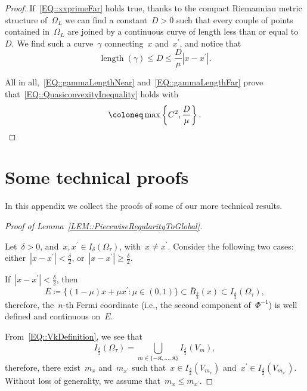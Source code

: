 \documentclass[12pt,a4paper]{amsart}
\makeatletter
\numberwithin{equation}{section}
\theoremstyle{definition}
\theoremstyle{remark}
\newcommand{\abs}[1]{\left\lvert#1\right\rvert}
\renewcommand{\leq}{\leqslant}
\renewcommand{\geq}{\geqslant}
\newcommand{\prooflabel}[2]{%
  \def\@currentlabelname{#2}%
  \label{#1}%
}
\newcommand{\constapp}[1]{%
  \csname constapp@#1\endcsname%
}
\makeatother
\begin{document}
\begin{appendix}
\begin{proof}
    If~\eqref{EQ::xxprimeFar} holds true, thanks to the compact Riemannian metric structure of~$\Omega_L$ we can find a constant~$D>0$ such that every couple of points contained in~$\Omega_L$ are joined by a continuous curve of length less than or equal to~$D$. We find such a curve~$\gamma$ connecting~$x$ and~$x^\prime$, and notice that
    \begin{equation}\label{EQ::gammaLengthFar}
        \operatorname{length}(\gamma) \leq D \leq \frac{D}{\mu}\abs{x-x^\prime}.
    \end{equation}

    All in all,~\eqref{EQ::gammaLengthNear} and~\eqref{EQ::gammaLengthFar} prove that~\eqref{EQ::QuasiconvexityInequality} holds with
    \[\constapp{CONST::Quasiconvexity} \coloneq \max\left\{C^2, \frac{D}{\mu}\right\}.\qedhere\]
\end{proof}

\section{Some technical proofs}\label{APP::TechnicalProofs}
In this appendix we collect the proofs of some of our more technical results.

\begin{proof}[Proof of Lemma~\ref{LEM::PiecewiseRegularityToGlobal}]\prooflabel{PRF::PiecewiseRegularityToGlobal}{Proof of Lemma~\ref{LEM::PiecewiseRegularityToGlobal}}
    Let~$\delta > 0$, and~$x,x^\prime \in I_\delta(\Omega_\tau)$, with~$x \neq x^\prime$. Consider the following two cases: either~$\abs{x-x^\prime} < \frac{\delta}{2}$, or~$\abs{x-x^\prime} \geq \frac{\delta}{2}$.

    If~$\abs{x-x^\prime} < \frac{\delta}{2}$, then
    \begin{equation}\label{EQ::SegmentIsInOmegaDelta}
        E \coloneq \bigg\{(1-\mu)x + \mu x^\prime \colon \mu \in (0,1)\bigg\} \subset \overline{B}_{\frac{\delta}{2}}(x) \subset I_{\frac{\delta}{2}}(\Omega_\tau),
    \end{equation}
    therefore, the~$n$-th Fermi coordinate (i.e., the second component of~$\Phi^{-1}$) is well defined and continuous on~$E$.

    From~\eqref{EQ::VkDefinition}, we see that
    \begin{equation}\label{EQ::OmegaDeltaVkPartition}
        I_{\frac{\delta}{2}}(\Omega_\tau) = \bigcup_{m \in \{-\mathfrak{K}, \dots, \mathfrak{K}\}}I_{\frac{\delta}{2}}(V_m),
    \end{equation}
    therefore, there exist~$m_x$ and~$m_{x^\prime}$ such that~$x \in I_{\frac{\delta}{2}}(V_{m_x})$ and~$x^\prime \in I_{\frac{\delta}{2}}(V_{m_{x^\prime}})$. Without loss of generality, we assume that~$m_x \leq m_{x^\prime}$.


\end{proof}
\end{appendix}
\end{document}
